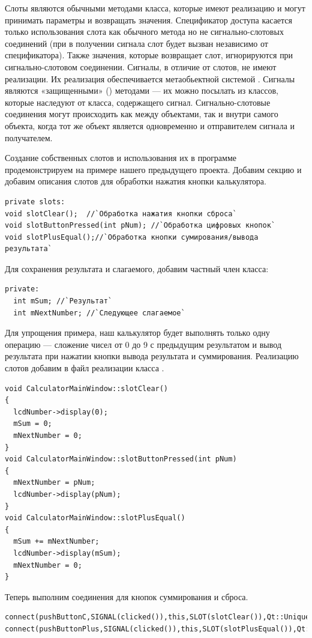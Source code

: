 Слоты являются обычными методами класса, которые имеют реализацию и могут  принимать параметры и возвращать
значения. Спецификатор доступа касается только использования слота как обычного метода но не сигнально-слотовых
соединений (при в получении сигнала слот будет вызван независимо от спецификатора). Также значения, которые возвращает
слот, игнорируются при сигнально-слотовом соединении. Сигналы, в отличие от слотов, не имеют реализации. Их реализация
обеспечивается метаобьектной системой . Сигналы являются «защищенными» () методами --- их можно
посылать из классов, которые наследуют от класса, содержащего сигнал. Сигнально-слотовые соединения могут происходить
как между объектами, так и внутри самого объекта, когда тот же объект является одновременно и отправителем сигнала и
получателем.

Создание собственных слотов и использования их  в программе продемонстрируем на примере нашего
предыдущего проекта. Добавим секцию  и добавим описания слотов для обработки нажатия кнопки
калькулятора.
\begin{lstlisting}
private slots:
void slotClear();  //`Обработка нажатия кнопки сброса`
void slotButtonPressed(int pNum); //`Обработка цифровых кнопок`
void slotPlusEqual();//`Обработка кнопки сумирования/вывода результата`
\end{lstlisting}

Для сохранения результата и слагаемого, добавим частный член класса:
\begin{lstlisting}
private:
  int mSum; //`Результат`
  int mNextNumber; //`Следующее слагаемое`
\end{lstlisting}

Для упрощения примера, наш калькулятор будет выполнять только одну операцию --- сложение чисел от 0 до 9 с предыдущим
результатом и вывод результата при нажатии кнопки вывода результата и суммирования. Реализацию слотов добавим в файл
реализации класса .
\begin{lstlisting}
void CalculatorMainWindow::slotClear()
{
  lcdNumber->display(0);
  mSum = 0;
  mNextNumber = 0;
}
void CalculatorMainWindow::slotButtonPressed(int pNum)
{
  mNextNumber = pNum;
  lcdNumber->display(pNum);
}
void CalculatorMainWindow::slotPlusEqual()
{
  mSum += mNextNumber;
  lcdNumber->display(mSum);
  mNextNumber = 0;
}
\end{lstlisting}

Теперь выполним соединения для кнопок суммирования и сброса.
\begin{lstlisting}
connect(pushButtonC,SIGNAL(clicked()),this,SLOT(slotClear()),Qt::UniqueConnection);
connect(pushButtonPlus,SIGNAL(clicked()),this,SLOT(slotPlusEqual()),Qt::UniqueConnection);
\end{lstlisting}

